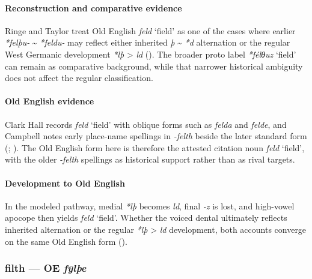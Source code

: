 \documentclass[
  british,
  a4paper,
]{article}
\providecommand{\Recon}[1]{\emph{*#1}}
\begin{document}
\paragraph{Reconstruction and comparative
evidence}\label{reconstruction-and-comparative-evidence-20}

Ringe and Taylor treat Old English {\emph{feld}} `field' as one of the
cases where earlier \emph{*felþu-} \textasciitilde{} \emph{*feldu-} may
reflect either inherited \emph{þ} \textasciitilde{} \emph{*d}
alternation or the regular West Germanic development \emph{*lþ}
\textgreater{} \emph{ld} (). The broader proto label \Recon{félθuz} `field' can
remain as comparative background, while that narrower historical
ambiguity does not affect the regular classification.

\paragraph{Old English evidence}\label{old-english-evidence-20}

Clark Hall records {\emph{feld}} `field' with oblique forms such as
\emph{felda} and \emph{felde}, and Campbell notes early place-name
spellings in \emph{-felth} beside the later standard form
(;
). The Old English form
here is therefore the attested citation noun {\emph{feld}} `field', with
the older \emph{-felth} spellings as historical support rather than as
rival targets.

\paragraph{Development to Old
English}\label{development-to-old-english-20}

In the modeled pathway, medial \emph{*lþ} becomes \emph{ld}, final
\emph{-z} is lost, and high-vowel apocope then yields {\emph{feld}}
`field'. Whether the voiced dental ultimately reflects inherited
alternation or the regular \emph{*lþ} \textgreater{} \emph{ld}
development, both accounts converge on the same Old English form
().

\subsubsection{\texorpdfstring{filth --- OE
\emph{fȳlþe}}{filth --- OE fȳlþe}}\label{filth-oe-fux233luxfee}
\end{document}
